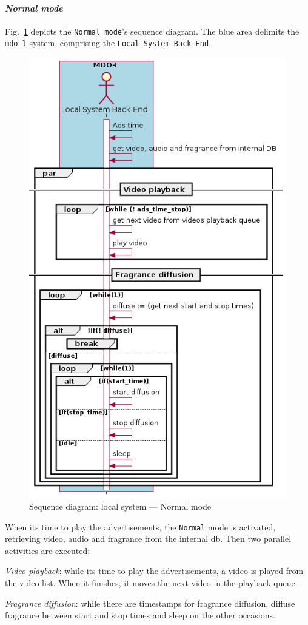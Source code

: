 \paragraph{\emph{Normal mode}}
Fig.~\ref{fig:seq-local-normal-mode} depicts the \texttt{Normal
  mode}'s sequence diagram. The blue area delimits the \texttt{\gls{mdo-l}}
system, comprising the \texttt{Local System Back-End}.
%
\begin{figure}[htb!]
  \centering
  \includegraphics[width=0.5\columnwidth]{./img/seq-local-normal-mode.png}
  \caption{Sequence diagram: local system --- Normal mode}%
\label{fig:seq-local-normal-mode}
\end{figure}

When its time to play the advertisements, the \texttt{Normal} mode is activated,
retrieving video, audio and fragrance from the internal \gls{db}. Then two
parallel activities are executed:
\begin{item-c}
\item \emph{Video playback}: while its time to play the advertisements, a video
  is played from the video list. When it finishes, it moves the next video in
  the playback queue.
\item \emph{Fragrance diffusion}: while there are timestamps for fragrance
  diffusion, diffuse fragrance between start and stop times and sleep on the
  other occasions.
\end{item-c}
%
